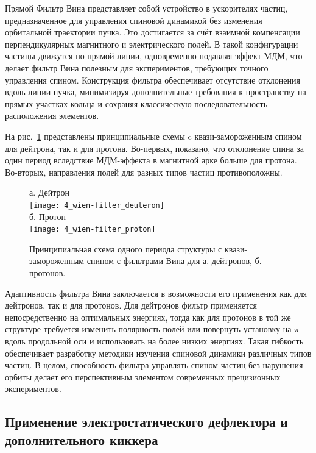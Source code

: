 \par Прямой Фильтр Вина представляет собой устройство в ускорителях частиц, предназначенное для управления спиновой динамикой без изменения орбитальной траектории пучка. Это достигается за счёт взаимной компенсации перпендикулярных магнитного и электрического полей. В такой конфигурации частицы движутся по прямой линии, одновременно подавляя эффект МДМ, что делает фильтр Вина полезным для экспериментов, требующих точного управления спином. Конструкция фильтра обеспечивает отсутствие отклонения вдоль линии пучка, минимизируя дополнительные требования к пространству на прямых участках кольца и сохраняя классическую последовательность расположения элементов.

\par На рис.~\ref{fig:wien-filter} представлены принципиальные схемы c квази-замороженным спином для дейтрона, так и для протона. Во-первых, показано, что отклонение спина за один период вследствие МДМ-эффекта в магнитной арке больше для протона. Во-вторых, направления полей для разных типов частиц противоположны.

\begin{figure} [h!]
	\centering
	а. Дейтрон\\
	\texttt{[image: 4\_wien-filter\_deuteron]}\\
	б. Протон\\
	\texttt{[image: 4\_wien-filter\_proton]}
	\caption{Принципиальная схема одного периода структуры с квази-замороженным спином с фильтрами Вина для а. дейтронов, б. протонов.}
	\label{fig:wien-filter}
\end{figure}

\par Адаптивность фильтра Вина заключается в возможности его применения как для дейтронов, так и для протонов. Для дейтронов фильтр применяется непосредственно на оптимальных энергиях, тогда как для протонов в той же структуре требуется изменить полярность полей или повернуть установку на $\pi$ вдоль продольной оси и использовать на более низких энергиях. Такая гибкость обеспечивает разработку методики изучения спиновой динамики различных типов частиц. В целом, способность фильтра управлять спином частиц без нарушения орбиты делает его перспективным элементом современных прецизионных экспериментов.

	\subsection{Применение электростатического дефлектора и дополнительного киккера}

